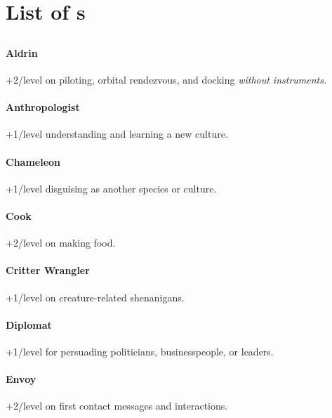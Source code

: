 
\section{List of \skillC s}
\hypertarget{skills}{}

\subsection{\feelingsC}
\hypertarget{skillsFeelings}{}

\paragraph{Aldrin}
\hypertarget{SkillAldrin}{}
+2/level on piloting, orbital rendezvous, and docking \textit{without instruments.}

\paragraph{Anthropologist}
\hypertarget{SkillAnthropologist}{}
+1/level understanding and learning a new culture.

\paragraph{Chameleon}
\hypertarget{SkillChameleon}{}
+1/level disguising as another species or culture.

\paragraph{Cook}
\hypertarget{SkillCook}{}
+2/level on making food.

\paragraph{Critter Wrangler}
\hypertarget{SkillCritterWrangler}{}
+1/level on creature-related shenanigans.

\paragraph{Diplomat}
\hypertarget{SkillDiplomat}{}
+1/level for persuading politicians, businesspeople, or leaders.

\paragraph{Envoy}
\hypertarget{SkillEnvoy}{}
+2/level on first contact messages and interactions.

